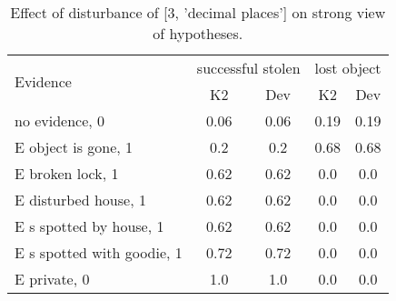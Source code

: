 \begin{table}\begin{tabular}{l|cc|cc}\toprule\multirow{2}{*}{Evidence} & \multicolumn{2}{c}{successful stolen}& \multicolumn{2}{c}{lost object}\\& {K2} & {Dev}& {K2} & {Dev}\\\midrule
no evidence, 0 & 0.06&0.06&0.19&0.19\\E object is gone, 1 & 0.2&0.2&0.68&0.68\\E broken lock, 1 & 0.62&0.62&0.0&0.0\\E disturbed house, 1 & 0.62&0.62&0.0&0.0\\E s spotted by house, 1 & 0.62&0.62&0.0&0.0\\E s spotted with goodie, 1 & 0.72&0.72&0.0&0.0\\E private, 0 & 1.0&1.0&0.0&0.0\\\bottomrule\end{tabular}\caption{Effect of disturbance of [3, 'decimal places'] on strong view of hypotheses.}\end{table}